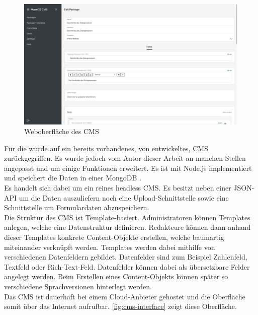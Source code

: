 \begin{figure}
    \centering
    \includegraphics[width=1\textwidth]{figures/images/cms-interface.png}
    \caption{Weboberfläche des CMS}
    \label{fig:cms-interface}
\end{figure}

Für die \shst{} wurde auf ein bereits vorhandenes, von \meso{} entwickeltes,
CMS zurückgegriffen. Es wurde jedoch vom Autor dieser Arbeit
an manchen Stellen angepasst und um einige Funktionen
erweitert. Es ist mit Node.js \cite{node} implementiert und speichert die Daten in einer 
MongoDB \cite{mongo}.\\
Es handelt sich dabei um ein reines headless CMS. Es besitzt neben einer JSON-API um die Daten 
auszuliefern noch eine Upload-Schnittstelle sowie eine Schnittstelle um Formulardaten abzuspeichern.\\
Die Struktur des CMS ist Template-basiert. Administratoren können Templates 
anlegen, welche eine Datenstruktur definieren. Redakteure können dann anhand dieser Templates 
konkrete Content-Objekte erstellen, welche baumartig miteinander verknüpft werden. Templates 
werden dabei mithilfe von verschiedenen Datenfeldern gebildet. Datenfelder sind zum Beispiel
Zahlenfeld, Textfeld oder Rich-Text-Feld. Datenfelder können dabei als übersetzbare Felder angelegt
werden. Beim Erstellen eines Content-Objekts können später so verschiedene Sprachversionen
hinterlegt werden.\\
Das CMS ist dauerhaft bei einem Cloud-Anbieter gehostet und die Oberfläche somit über das
Internet aufrufbar. \autoref{fig:cms-interface} zeigt diese Oberfläche.
